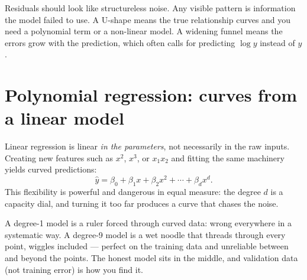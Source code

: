 \begin{keyidea}
Residuals should look like structureless noise. Any visible pattern is information the model failed to use. A U-shape means the true relationship curves and you need a polynomial term or a non-linear model. A widening funnel means the errors grow with the prediction, which often calls for predicting $\log y$ instead of $y$.
\end{keyidea}

\section{Polynomial regression: curves from a linear model}

Linear regression is linear \emph{in the parameters}, not necessarily in the raw inputs. Creating new features such as $x^2$, $x^3$, or $x_1x_2$ and fitting the same machinery yields curved predictions:
\[
  \hat{y}=\beta_0+\beta_1x+\beta_2x^2+\cdots+\beta_dx^d.
\]
This flexibility is powerful and dangerous in equal measure: the degree $d$ is a capacity dial, and turning it too far produces a curve that chases the noise.

\begin{mlfigure}
\end{mlfigure}

\begin{intuition}
A degree-1 model is a ruler forced through curved data: wrong everywhere in a systematic way. A degree-9 model is a wet noodle that threads through every point, wiggles included --- perfect on the training data and unreliable between and beyond the points. The honest model sits in the middle, and validation data (not training error) is how you find it.
\end{intuition}

